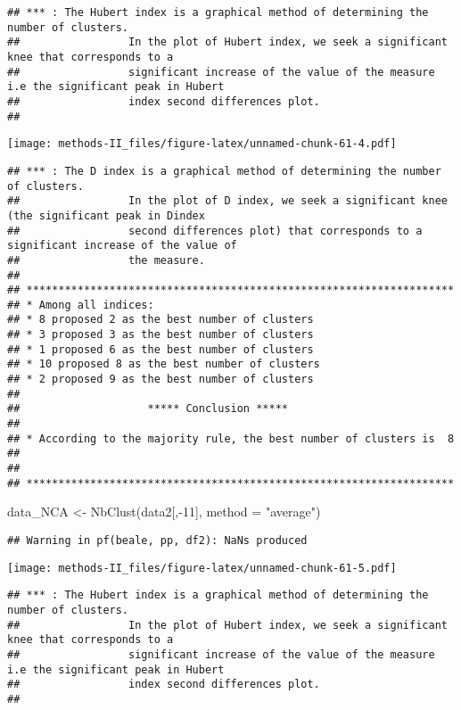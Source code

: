 \documentclass[
]{article}
\newenvironment{Shaded}{\begin{snugshade}}{\end{snugshade}}
\newcommand{\AttributeTok}[1]{\textcolor[rgb]{0.77,0.63,0.00}{#1}}
\newcommand{\DecValTok}[1]{\textcolor[rgb]{0.00,0.00,0.81}{#1}}
\newcommand{\FunctionTok}[1]{\textcolor[rgb]{0.00,0.00,0.00}{#1}}
\newcommand{\NormalTok}[1]{#1}
\newcommand{\OtherTok}[1]{\textcolor[rgb]{0.56,0.35,0.01}{#1}}
\newcommand{\SpecialCharTok}[1]{\textcolor[rgb]{0.00,0.00,0.00}{#1}}
\newcommand{\StringTok}[1]{\textcolor[rgb]{0.31,0.60,0.02}{#1}}
\begin{document}
\begin{verbatim}
## *** : The Hubert index is a graphical method of determining the number of clusters.
##                 In the plot of Hubert index, we seek a significant knee that corresponds to a 
##                 significant increase of the value of the measure i.e the significant peak in Hubert
##                 index second differences plot. 
## 
\end{verbatim}

\texttt{[image: methods-II\_files/figure-latex/unnamed-chunk-61-4.pdf]}

\begin{verbatim}
## *** : The D index is a graphical method of determining the number of clusters. 
##                 In the plot of D index, we seek a significant knee (the significant peak in Dindex
##                 second differences plot) that corresponds to a significant increase of the value of
##                 the measure. 
##  
## ******************************************************************* 
## * Among all indices:                                                
## * 8 proposed 2 as the best number of clusters 
## * 3 proposed 3 as the best number of clusters 
## * 1 proposed 6 as the best number of clusters 
## * 10 proposed 8 as the best number of clusters 
## * 2 proposed 9 as the best number of clusters 
## 
##                    ***** Conclusion *****                            
##  
## * According to the majority rule, the best number of clusters is  8 
##  
##  
## *******************************************************************
\end{verbatim}

\begin{Shaded}
\begin{Highlighting}[]
\NormalTok{data\_NCA }\OtherTok{\textless{}{-}} \FunctionTok{NbClust}\NormalTok{(data2[,}\SpecialCharTok{{-}}\DecValTok{11}\NormalTok{], }\AttributeTok{method =} \StringTok{"average"}\NormalTok{)}
\end{Highlighting}
\end{Shaded}

\begin{verbatim}
## Warning in pf(beale, pp, df2): NaNs produced
\end{verbatim}

\texttt{[image: methods-II\_files/figure-latex/unnamed-chunk-61-5.pdf]}

\begin{verbatim}
## *** : The Hubert index is a graphical method of determining the number of clusters.
##                 In the plot of Hubert index, we seek a significant knee that corresponds to a 
##                 significant increase of the value of the measure i.e the significant peak in Hubert
##                 index second differences plot. 
## 
\end{verbatim}
\end{document}
